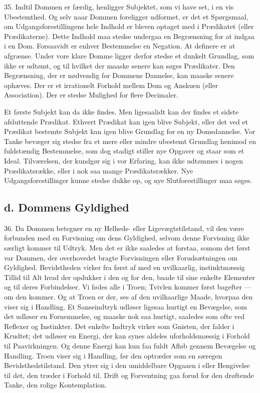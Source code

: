 \documentclass[12pt,a4paper]{book}
\newcommand{\apage}[1]{\marginnote{\footnotesize\textit{[#1]}}}
\begin{document}
35. Indtil Dommen er færdig, henligger Subjektet, som vi have set, i en
vis Ubestemthed. Og selv naar Dommen foreligger udformet, er det et
Spørgsmaal, om Udgangsforestillingens hele Indhold er bleven optaget med
i Prædikatet (eller Prædikaterne). Dette Indhold maa stedse undergaa en
Begrænsning for at indgaa i en Dom. Forsaavidt er enhver Bestemmelse en
Negation. At definere er at afgrænse. Under vore klare Domme ligger
derfor stedse et dunkelt Grundlag, som ikke er udtømt, og til hvilket
der maaske senere kan søges Prædikater. Den Begrænsning, der er
nødvendig for Dommens Dannelse, kan maaske senere ophæves. Der er et
irrationelt Forhold mellem Dom og Anskuen (eller Association). Der er
stedse Mulighed for flere Decimaler.

Et første Subjekt kan da ikke findes. Men ligesaalidt kan der findes et
sidste afsluttende Prædikat. Ethvert \apage{99} Prædikat kan igen blive Subjekt,
eller det ved et Prædikat bestemte Subjekt kan igen blive Grundlag for
en ny Domsdannelse. Vor Tanke bevæger sig stedse fra et mere eller
mindre ubestemt Grundlag henimod en fuldstændig Bestemmelse, som dog
stadigt stiller nye Opgaver og staar som et Ideal. Tilværelsen, der
kundgør sig i vor Erfaring, kan ikke udtømmes i nogen Prædikatsrække,
eller i nok saa mange Prædikatsrækker. Nye Udgangsforestillinger kunne
stedse dukke op, og nye Slutforestillinger maa søges.

\subsection*{d. Dommens Gyldighed}
\label{ssec:gyldighed}

36. Da Dommen betegner en ny Helheds- eller Ligevægtstilstand, vil den
være forbunden med en Forvisning om dens Gyldighed, selvom denne
Forvisning ikke særligt kommer til Udtryk. Men det er ikke saaledes at
forstaa, somom det først var Dommen, der overhovedet bragte Forvisningen
eller Forudsætningen om Gyldighed. Bevidstheden virker fra først af med
en uvilkaarlig, instinktmæssig Tillid til Alt hvad der opdukker i den og
for den, baade til sine enkelte Elementer og til deres Forbindelser. Vi
fødes alle i Troen; Tvivlen kommer først bagefter --- om den kommer. Og
at Troen er der, ses af den uvilkaarlige Maade, hvorpaa den viser sig i
Handling. Et Sanseindtryk udløser ligesaa hurtigt en Bevægelse, som det
udløser en Fornemmelse, og maaske nok saa hurtigt, saaledes som ofte ved
Reflexer og Instinkter. Det enkelte Indtryk virker som Gnisten, der
falder i Krudtet; det udløser en Energi, der kan synes aldeles
uforholdsmæssig i Forhold til Paavirkningen. Og denne Energi kan kun faa
fuldt Afløb gennem Bevægelse og Handling. Troen viser sig i Handling,
før den optræder som en særegen Bevidsthedstilstand. Den ytrer sig i den
umiddelbare Opgaaen i eller Hengivelse til det, den træder i Forhold
til. Drift og Forventning gaa forud for den drøftende Tanke, den rolige
Kontemplation.
\end{document}

